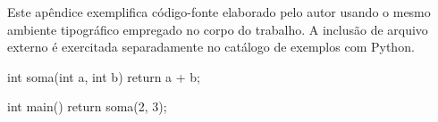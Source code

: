 \label{ap:codigo}

Este apêndice exemplifica código-fonte elaborado pelo autor usando o mesmo ambiente tipográfico empregado no corpo do trabalho. A inclusão de arquivo externo é exercitada separadamente no catálogo de exemplos com Python.

\lstset{language=C++,numbers=left,stepnumber=1,numbersep=8pt}
\label{cod:apendice-cpp}
\begin{ufclisting}[here]
int soma(int a, int b) {
    return a + b;
}

int main() {
    return soma(2, 3);
}
\end{ufclisting}
\lstset{numbers=none,stepnumber=1}
